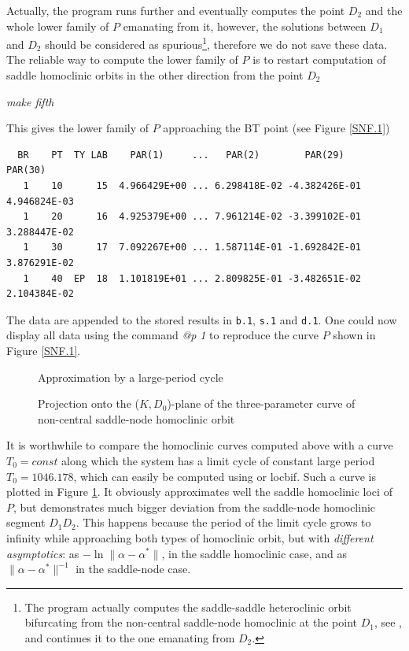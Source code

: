 \documentclass[12pt]{report}
\begin{document}
Actually, the program runs further and
eventually computes the point $D_2$ and the whole lower family of $P$
emanating from it, however, the solutions between $D_1$ and $D_2$
should be considered as spurious\footnote{\label{ft1} The program actually
computes the saddle-saddle heteroclinic orbit bifurcating from the
non-central saddle-node homoclinic at the point $D_1$, see
, and continues it to the one emanating from
$D_2$.}, therefore we do not save these data.
The reliable way to compute the lower family of $P$ is to restart computation
of saddle homoclinic orbits in the other direction from the point $D_2$
\begin{center}
{\it make fifth}
\end{center}
This gives the lower family of $P$ approaching the BT point
(see Figure \ref{SNF.1})
\begin{verbatim}
  BR    PT  TY LAB    PAR(1)     ...   PAR(2)        PAR(29)       PAR(30)    
   1    10      15  4.966429E+00 ... 6.298418E-02 -4.382426E-01  4.946824E-03
   1    20      16  4.925379E+00 ... 7.961214E-02 -3.399102E-01  3.288447E-02
   1    30      17  7.092267E+00 ... 1.587114E-01 -1.692842E-01  3.876291E-02
   1    40  EP  18  1.101819E+01 ... 2.809825E-01 -3.482651E-02  2.104384E-02
\end{verbatim}
The data are appended to the stored results in {\tt b.1}, {\tt s.1} and
{\tt d.1}. One could now display all data using the \AUTO
command {\it @p 1} to reproduce the curve $P$ shown in Figure
\ref{SNF.1}.
\par
\begin{figure}[p]
\epsfysize 10.0cm
\centerline{}
\caption{Approximation by a large-period cycle}
\label{SNF.2}
\end{figure}
\begin{figure}[p]
\epsfysize 9.0cm
\centerline{}
\caption{Projection onto the ($K,D_0$)-plane of the 
three-parameter curve of non-central  saddle-node homoclinic orbit}
\label{SNF.3}
\end{figure}
%
It is worthwhile to compare the homoclinic curves computed above with
a curve $T_0=const$ along which the system has a limit cycle of constant large
period $T_0=1046.178$, which can easily be computed using \AUTO or
{\cal locbif}. Such a curve is plotted in Figure \ref{SNF.2}. 
It obviously approximates well the saddle homoclinic loci of $P$, but 
demonstrates much bigger
deviation from the saddle-node homoclinic segment $D_1D_2$. This happens
because the period of the limit cycle grows to infinity while approaching both
types of homoclinic orbit, but with {\it different asymptotics}: 
as $-\ln\|\alpha-\alpha^*\|$, in the saddle homoclinic case, and 
as $\|\alpha-\alpha^*\|^{-1}$ in the saddle-node case. 
\end{document}
